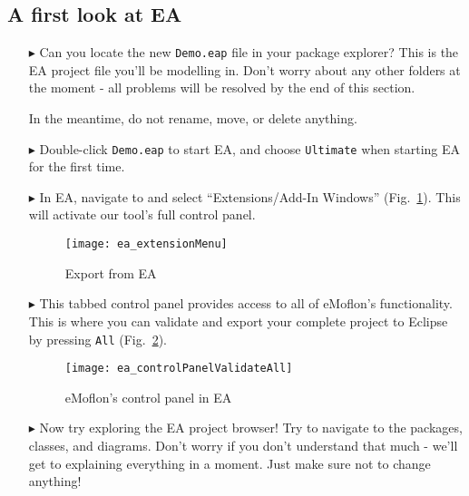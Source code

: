 \clearpage
\visHeader

\subsection{A first look at EA}

\begin{itemize}
\FloatBarrier
\hypertarget{simpleDemo vis}{}
\item[$\blacktriangleright$] Can you locate the new \texttt{Demo.eap} file in your package explorer? This is the EA project file you'll be
modelling in. Don't worry about any other folders at the moment - all problems will be resolved by the end of this section.

In the meantime, do not rename, move, or delete anything.

\item[$\blacktriangleright$] Double-click \texttt{Demo.eap} to start EA, and choose \texttt{Ultimate} when starting EA for the first time.

\item[$\blacktriangleright$] In EA, navigate to and select ``Extensions/Add-In Windows'' (Fig.~\ref{ea:validate_dropdown}). This will activate our tool's full
control panel.

\vspace{0.5cm}

\begin{figure}[htbp]
	\centering
  \texttt{[image: ea\_extensionMenu]}
	\caption{Export from EA} 
	\label{ea:validate_dropdown} 
\end{figure}

\item[$\blacktriangleright$] This tabbed control panel provides access to all of
eMoflon's functionality. This is where you can validate and export your complete project to Eclipse by pressing \texttt{All} (Fig.~\ref{ea:controlPanel}).

\begin{figure}[htbp]
	\centering
  \texttt{[image: ea\_controlPanelValidateAll]}
	\caption{eMoflon's control panel in EA} 
	\label{ea:controlPanel} 
\end{figure}

\item[$\blacktriangleright$] Now try exploring the EA project browser! Try to navigate to the packages, classes, and diagrams. Don't worry if you don't
understand that much - we'll get to explaining everything in a moment. Just make sure not to change anything!


\end{itemize}
